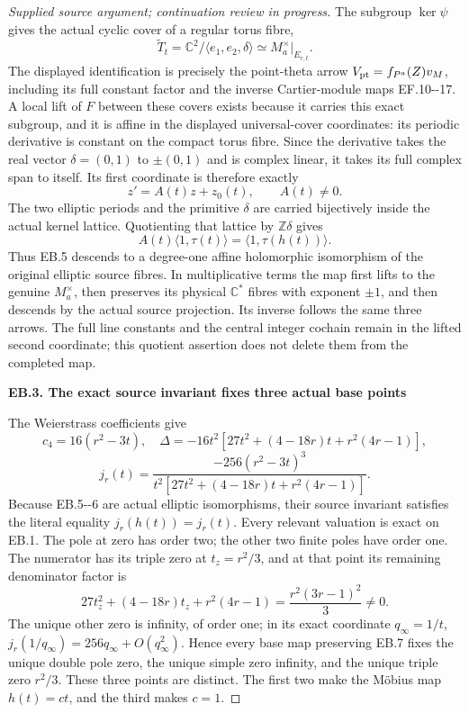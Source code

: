 \begin{proof}[Supplied source argument; continuation review in progress]
The subgroup \(\ker\psi\) gives the actual cyclic cover of a
regular torus fibre,
\[
 \widetilde T_t=
 \mathbb C^2/\langle e_1,e_2,\delta\rangle
           \simeq M_a^\times|_{E_{r,t}}.
 \tag{EB.4}
\]
The displayed identification is precisely the point-theta arrow
\(V_{\rm pt}=f_{P^a}(Z)v_M\), including its full constant factor
and the inverse Cartier-module maps EF.10-\/-17. A local lift of
\(F\) between these covers exists because it carries this exact
subgroup, and it is affine in the displayed universal-cover
coordinates: its periodic derivative is constant on the compact
torus fibre. Since the derivative takes the real vector
\(\delta=(0,1)\) to \(\pm(0,1)\) and is complex linear, it
takes its full complex span to itself. Its first coordinate is
therefore exactly
\[
                       z'=A(t)z+z_0(t),\qquad A(t)\ne0.
 \tag{EB.5}
\]
The two elliptic periods and the primitive \(\delta\) are carried
bijectively inside the actual kernel lattice. Quotienting that
lattice by \(\mathbb Z\delta\) gives
\[
          A(t)\langle1,\tau(t)\rangle
                =\langle1,\tau(h(t))\rangle.
 \tag{EB.6}
\]
Thus EB.5 descends to a degree-one affine holomorphic isomorphism
of the original elliptic source fibres. In multiplicative terms the
map first lifts to the genuine \(M_a^\times\), then preserves its
physical \(\mathbb C^*\) fibres with exponent \(\pm1\), and
then descends by the actual source projection. Its inverse follows
the same three arrows. The full line constants and the central
integer cochain remain in the lifted second coordinate; this
quotient assertion does not delete them from the completed map.

\par

\medskip\noindent\textbf{EB.3. The exact source invariant fixes three actual base points}

\par\nobreak

The Weierstrass coefficients give
\[
 c_4=16(r^2-3t),\quad
 \Delta=-16t^2[27t^2+(4-18r)t+r^2(4r-1)],
\]
\[
 j_r(t)=\frac{-256(r^2-3t)^3}
 {t^2[27t^2+(4-18r)t+r^2(4r-1)]}.
 \tag{EB.7}
\]
Because EB.5-\/-6 are actual elliptic isomorphisms, their source
invariant satisfies the literal equality
\(j_r(h(t))=j_r(t)\). Every relevant valuation is exact on EB.1.
The pole at zero has order two; the other two finite poles have
order one. The numerator has its triple zero at
\(t_z=r^2/3\), and at that point its remaining denominator factor is
\[
 27t_z^2+(4-18r)t_z+r^2(4r-1)
                  =\frac{r^2(3r-1)^2}{3}\ne0.
 \tag{EB.8}
\]
The unique other zero is infinity, of order one; in its exact
coordinate \(q_\infty=1/t\),
\(j_r(1/q_\infty)=256q_\infty+O(q_\infty^2)\).
Hence every base map preserving EB.7 fixes the unique double pole
zero, the unique simple zero infinity, and the unique triple zero
\(r^2/3\). These three points are distinct. The first two make the
Möbius map \(h(t)=ct\), and the third makes \(c=1\).


\end{proof}
